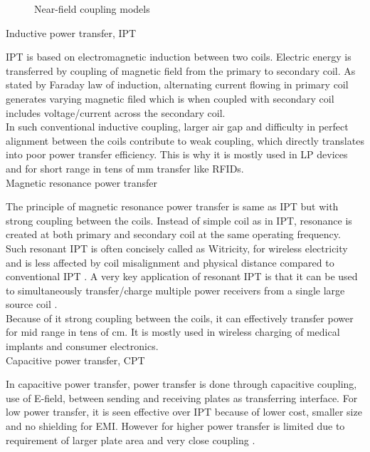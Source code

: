 \documentclass[12pt,a4paper,UKenglish]{article}
\begin{document}
\begin{figure} [htbp]
 	\caption{Near-field coupling models} 
	\label{visio_model} 
\end{figure}

Inductive power transfer, IPT

IPT is based on electromagnetic induction between two coils. Electric energy is transferred by coupling of 
magnetic field from the primary to secondary coil. As stated by Faraday law of induction, alternating current 
flowing in primary coil generates varying magnetic filed which is when coupled with secondary coil includes 
voltage/current across the secondary coil. \\

In such conventional inductive coupling, larger air gap and difficulty in perfect alignment between the coils 
contribute to weak coupling, which directly translates into poor power transfer efficiency. This is why it is 
mostly used in LP devices and for short range in tens of mm transfer like RFIDs. \\

Magnetic resonance power transfer

The principle of magnetic resonance power transfer is same as IPT but with strong coupling between the coils. 
Instead of simple coil as in IPT, resonance is created at both primary and secondary coil at the same operating 
frequency. Such resonant IPT is often concisely called as  Witricity, for wireless electricity and is less 
affected by coil misalignment and physical distance compared to conventional IPT  \cite{wpt_witricity}. A very 
key application of resonant IPT is that it can be used to simultaneously transfer/charge multiple power 
receivers from a single large source coil \cite{wpt_mutliple_device_charging}. \\

Because of it strong coupling between the coils, it can effectively transfer power for mid range in tens of cm. 
It is mostly used in  wireless charging of medical implants and consumer electronics. \\

Capacitive power transfer, CPT

In capacitive power transfer, power transfer is done through capacitive coupling, use of E-field, between sending 
and receiving plates as transferring interface. For low power transfer, it is seen effective over IPT because of 
lower cost, smaller size and no shielding for EMI. However for higher power transfer is limited due to 
requirement of larger plate area and very close coupling \cite{wpt_cpt}. \\
\end{document}
